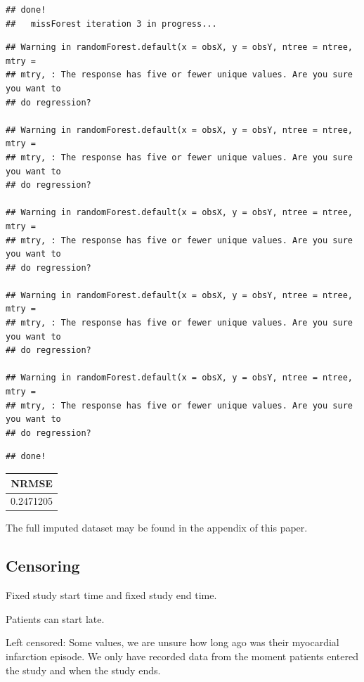 \documentclass[
]{article}
\begin{document}
\begin{verbatim}
## done!
##   missForest iteration 3 in progress...
\end{verbatim}

\begin{verbatim}
## Warning in randomForest.default(x = obsX, y = obsY, ntree = ntree, mtry =
## mtry, : The response has five or fewer unique values. Are you sure you want to
## do regression?

## Warning in randomForest.default(x = obsX, y = obsY, ntree = ntree, mtry =
## mtry, : The response has five or fewer unique values. Are you sure you want to
## do regression?

## Warning in randomForest.default(x = obsX, y = obsY, ntree = ntree, mtry =
## mtry, : The response has five or fewer unique values. Are you sure you want to
## do regression?

## Warning in randomForest.default(x = obsX, y = obsY, ntree = ntree, mtry =
## mtry, : The response has five or fewer unique values. Are you sure you want to
## do regression?

## Warning in randomForest.default(x = obsX, y = obsY, ntree = ntree, mtry =
## mtry, : The response has five or fewer unique values. Are you sure you want to
## do regression?
\end{verbatim}

\begin{verbatim}
## done!
\end{verbatim}

\begin{tabular}{r}
\hline
NRMSE\\
\hline
0.2471205\\
\hline
\end{tabular}

The full imputed dataset may be found in the appendix of this paper.

\hypertarget{censoring}{%
\subsection{Censoring}\label{censoring}}

Fixed study start time and fixed study end time.

Patients can start late.

Left censored: Some values, we are unsure how long ago was their
myocardial infarction episode. We only have recorded data from the
moment patients entered the study and when the study ends.
\end{document}
